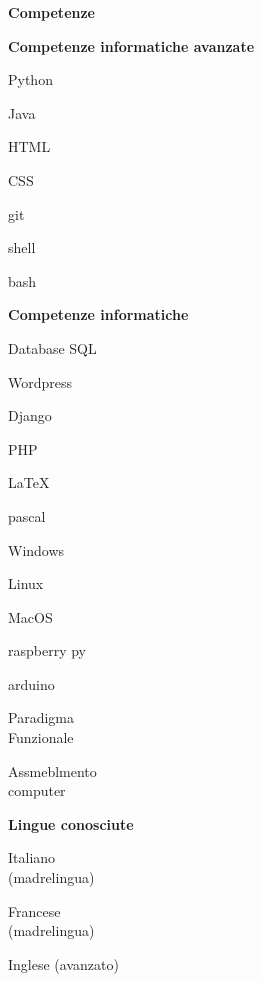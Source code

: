 \documentclass[a4paper,12pt,final]{memoir}
\newcommand{\Sep}{\vspace{1.5em}}
\newcommand{\SmallSep}{\vspace{0.5em}}
\newcommand{\CVSection}[1]
	{\Large\textbf{#1}\par
	\SmallSep\normalsize\normalfont}
\newcommand{\CVItem}[1]
	{\textbf{\color{RoyalBlue} #1}}
\begin{document}
\CVSection{Competenze}
\CVItem{Competenze informatiche avanzate}
\begin{multicols}{3}
\begin{compactitem}[\color{RoyalBlue}$\circ$]
	\item Python 
	\item Java
	\item HTML
	\item CSS
	\item git
	\item shell
	\item bash
\end{compactitem}
\end{multicols}
\SmallSep

\CVItem{Competenze informatiche}
\begin{multicols}{3}
\begin{compactitem}[\color{RoyalBlue}$\circ$]
	\item Database SQL
	\item Wordpress
	\item Django
	\item PHP
	\item \LaTeX
	\item pascal
	\item Windows
	\item Linux
	\item MacOS
	\item raspberry py
	\item arduino
	\item Paradigma\\Funzionale
	\item Assmeblmento\\computer
\end{compactitem}
\end{multicols}
\SmallSep

\clearpage
\framebreak
\framebreak

\CVItem{Lingue conosciute}
\begin{multicols}{3}
\begin{compactitem}[\color{RoyalBlue}$\circ$]
	\item Italiano\\(madrelingua)
	\item Francese\\(madrelingua)
	\item Inglese (avanzato)
\end{compactitem}
\end{multicols}
\Sep 
\end{document}
